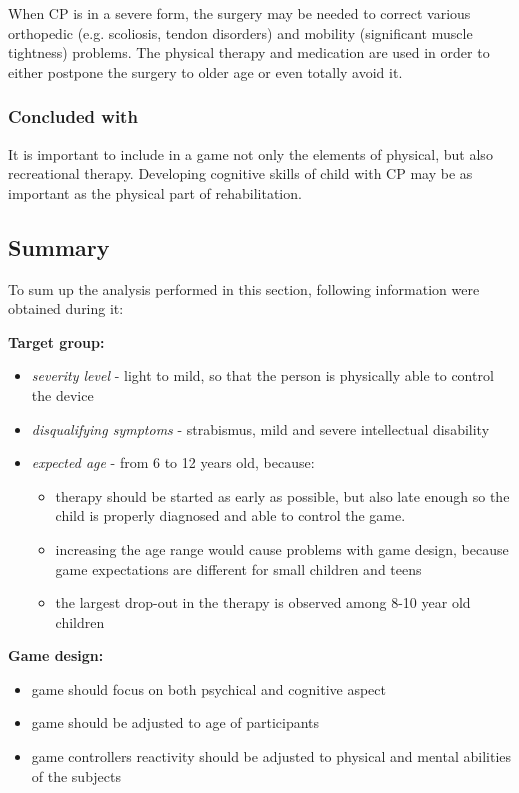 When CP is in a severe form, the surgery may be needed to correct various orthopedic (e.g. scoliosis, tendon disorders) and mobility (significant muscle tightness) problems. The physical therapy and medication are used in order to either postpone the surgery to older age or even totally avoid it.

\subsubsection*{Concluded with}
It is important to include in a game not only the elements of physical, but also recreational therapy. Developing cognitive skills of child with CP may be as important as the physical part of rehabilitation.

\subsection{Summary}
To sum up the analysis performed in this section, following information were obtained during it:

\textbf{Target group:}
\begin{itemize}
\item \emph{severity level} - light to mild, so that the person is physically able to control the device
\item \emph{disqualifying symptoms} - strabismus, mild and severe intellectual disability
\item \emph{expected age} - from 6 to 12 years old, because:
\begin{itemize}
\item therapy should be started as early as possible, but also late enough so the child is properly diagnosed and able to control the game. 
\item increasing the age range would cause problems with game design, because game expectations are different for small children and teens
\item the largest drop-out in the therapy is observed among 8-10 year old children
\end{itemize}
\end{itemize}

\textbf{Game design:}
\begin{itemize}
\item game should focus on both psychical and cognitive aspect
\item game should be adjusted to age of participants
\item game controllers reactivity should be adjusted to physical and mental abilities of the subjects
\end{itemize}

